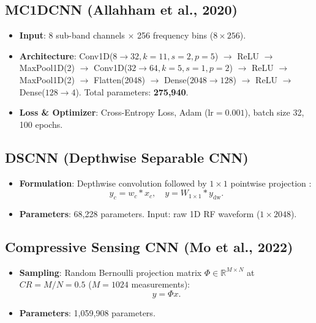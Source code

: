 \documentclass[journal,10pt,twocolumn]{IEEEtran}
\begin{document}
\subsection{MC1DCNN (Allahham et al., 2020)}
\begin{itemize}
    \item \textbf{Input}: 8 sub-band channels $\times$ 256 frequency bins ($8 \times 256$).
    \item \textbf{Architecture}: Conv1D($8 \rightarrow 32, k=11, s=2, p=5$) $\rightarrow$ ReLU $\rightarrow$ MaxPool1D(2) $\rightarrow$ Conv1D($32 \rightarrow 64, k=5, s=1, p=2$) $\rightarrow$ ReLU $\rightarrow$ MaxPool1D(2) $\rightarrow$ Flatten(2048) $\rightarrow$ Dense($2048 \rightarrow 128$) $\rightarrow$ ReLU $\rightarrow$ Dense($128 \rightarrow 4$). Total parameters: \textbf{275,940}.
    \item \textbf{Loss \& Optimizer}: Cross-Entropy Loss, Adam ($\text{lr} = 0.001$), batch size 32, 100 epochs.
\end{itemize}

\subsection{DSCNN (Depthwise Separable CNN)}
\begin{itemize}
    \item \textbf{Formulation}: Depthwise convolution followed by $1 \times 1$ pointwise projection \cite{medaiyese2021machine}:
    \begin{equation}
    y_c = w_c \ast x_c, \quad y = W_{1\times 1} \ast y_{\text{dw}}.
    \label{eq:dscnn}
    \end{equation}
    \item \textbf{Parameters}: 68,228 parameters. Input: raw 1D RF waveform ($1 \times 2048$).
\end{itemize}

\subsection{Compressive Sensing CNN (Mo et al., 2022)}
\begin{itemize}
    \item \textbf{Sampling}: Random Bernoulli projection matrix $\Phi \in \mathbb{R}^{M \times N}$ at $CR = M/N = 0.5$ ($M=1024$ measurements):
    \begin{equation}
    y = \Phi x.
    \label{eq:cs_projection}
    \end{equation}
    \item \textbf{Parameters}: 1,059,908 parameters.
\end{itemize}
\end{document}
